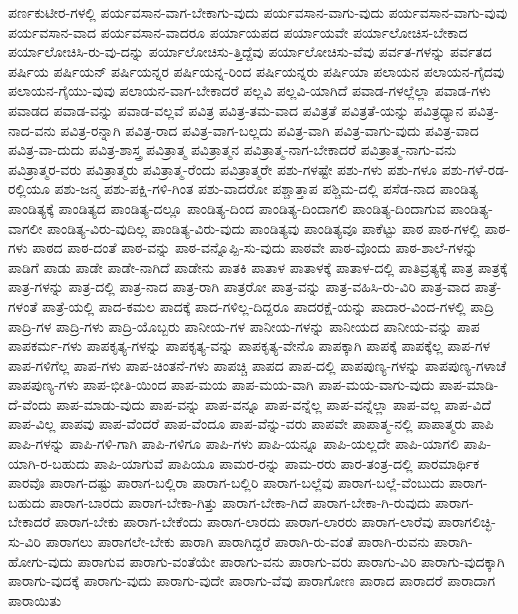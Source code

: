 {ಪರ್ಣಕುಟೀರ-ಗಳಲ್ಲಿ
ಪರ್ಯವಸಾನ-ವಾಗ-ಬೇಕಾಗು-ವುದು
ಪರ್ಯವಸಾನ-ವಾಗು-ವುದು
ಪರ್ಯವಸಾನ-ವಾಗು-ವುವು
ಪರ್ಯವಸಾನ-ವಾದ
ಪರ್ಯವಸಾನ-ವಾದರೂ
ಪರ್ಯಾಯಪದ
ಪರ್ಯಾಯವೇ
ಪರ್ಯಾಲೋಚಿಸ-ಬೇಕಾದ
ಪರ್ಯಾಲೋಚಿಸಿ-ರು-ವು-ದನ್ನು
ಪರ್ಯಾಲೋಚಿಸು-ತ್ತಿದ್ದೆವು
ಪರ್ಯಾಲೋಚಿಸು-ವೆವು
ಪರ್ವತ-ಗಳನ್ನು
ಪರ್ವತದ
ಪರ್ಷಿಯ
ಪರ್ಷಿಯನ್
ಪರ್ಷಿಯನ್ನರ
ಪರ್ಷಿಯನ್ನ-ರಿಂದ
ಪರ್ಷಿಯನ್ನರು
ಪರ್ಷಿಯಾ
ಪಲಾಯನ
ಪಲಾಯನ-ಗೈದವು
ಪಲಾಯನ-ಗೈಯು-ವುವು
ಪಲಾಯನ-ವಾಗ-ಬೇಕಾದರೆ
ಪಲ್ಲವಿ
ಪಲ್ಲವಿ-ಯಾಗಿದೆ
ಪವಾಡ-ಗಳಲ್ಲೆಲ್ಲಾ
ಪವಾಡ-ಗಳು
ಪವಾಡದ
ಪವಾಡ-ವನ್ನು
ಪವಾಡ-ವಲ್ಲವೆ
ಪವಿತ್ರ
ಪವಿತ್ರ-ತಮ-ವಾದ
ಪವಿತ್ರತೆ
ಪವಿತ್ರತೆ-ಯನ್ನು
ಪವಿತ್ರಧ್ಯಾನ
ಪವಿತ್ರ-ನಾದ-ವನು
ಪವಿತ್ರ-ರನ್ನಾಗಿ
ಪವಿತ್ರ-ರಾದ
ಪವಿತ್ರ-ವಾಗ-ಬಲ್ಲದು
ಪವಿತ್ರ-ವಾಗಿ
ಪವಿತ್ರ-ವಾಗು-ವುದು
ಪವಿತ್ರ-ವಾದ
ಪವಿತ್ರ-ವಾ-ದುದು
ಪವಿತ್ರ-ಶಾಸ್ತ್ರ
ಪವಿತ್ರಾತ್ಮ
ಪವಿತ್ರಾತ್ಮನ
ಪವಿತ್ರಾತ್ಮ-ನಾಗ-ಬೇಕಾದರೆ
ಪವಿತ್ರಾತ್ಮ-ನಾಗು-ವನು
ಪವಿತ್ರಾತ್ಮರ-ವರು
ಪವಿತ್ರಾತ್ಮರು
ಪವಿತ್ರಾತ್ಮ-ರೆಂದು
ಪವಿತ್ರಾತ್ಮರೇ
ಪಶು-ಗಳಷ್ಟೇ
ಪಶು-ಗಳು
ಪಶು-ಗಳೂ
ಪಶು-ಗಳೆ-ರಡ-ರಲ್ಲಿಯೂ
ಪಶು-ಜನ್ಮ
ಪಶು-ಪಕ್ಷಿ-ಗಳಿ-ಗಿಂತ
ಪಶು-ವಾದರೋ
ಪಶ್ಚಾತ್ತಾಪ
ಪಶ್ಚಿಮ-ದಲ್ಲಿ
ಪಸೆಡ-ನಾದ
ಪಾಂಡಿತ್ಯ
ಪಾಂಡಿತ್ಯಕ್ಕೆ
ಪಾಂಡಿತ್ಯದ
ಪಾಂಡಿತ್ಯ-ದಲ್ಲೂ
ಪಾಂಡಿತ್ಯ-ದಿಂದ
ಪಾಂಡಿತ್ಯ-ದಿಂದಾಗಲಿ
ಪಾಂಡಿತ್ಯ-ದಿಂದಾಗುವ
ಪಾಂಡಿತ್ಯ-ವಾಗಲೀ
ಪಾಂಡಿತ್ಯ-ವಿರು-ವುದಿಲ್ಲ
ಪಾಂಡಿತ್ಯ-ವಿರು-ವುದು
ಪಾಂಡಿತ್ಯವು
ಪಾಂಡಿತ್ಯವೂ
ಪಾಕೆಟ್ಟು
ಪಾಠ
ಪಾಠ-ಗಳಲ್ಲಿ
ಪಾಠ-ಗಳು
ಪಾಠದ
ಪಾಠ-ದಂತೆ
ಪಾಠ-ವನ್ನು
ಪಾಠ-ವನ್ನೊಪ್ಪಿ-ಸು-ವುದು
ಪಾಠವೇ
ಪಾಠ-ವೊಂದು
ಪಾಠ-ಶಾಲೆ-ಗಳನ್ನು
ಪಾಡಿಗೆ
ಪಾಡು
ಪಾಡೇ
ಪಾಡೇ-ನಾಗಿದೆ
ಪಾಡೇನು
ಪಾತಕಿ
ಪಾತಾಳ
ಪಾತಾಳಕ್ಕೆ
ಪಾತಾಳ-ದಲ್ಲಿ
ಪಾತಿವ್ರತ್ಯಕ್ಕೆ
ಪಾತ್ರ
ಪಾತ್ರಕ್ಕೆ
ಪಾತ್ರ-ಗಳನ್ನು
ಪಾತ್ರ-ದಲ್ಲಿ
ಪಾತ್ರ-ನಾದ
ಪಾತ್ರ-ರಾಗಿ
ಪಾತ್ರರೋ
ಪಾತ್ರ-ವನ್ನು
ಪಾತ್ರ-ವಹಿಸಿ-ರು-ವಿರಿ
ಪಾತ್ರ-ವಾದ
ಪಾತ್ರೆ-ಗಳಂತೆ
ಪಾತ್ರೆ-ಯಲ್ಲಿ
ಪಾದ-ಕಮಲ
ಪಾದಕ್ಕೆ
ಪಾದ-ಗಳಿಲ್ಲ-ದಿದ್ದರೂ
ಪಾದರಕ್ಷೆ-ಯನ್ನು
ಪಾದಾರ-ವಿಂದ-ಗಳಲ್ಲಿ
ಪಾದ್ರಿ
ಪಾದ್ರಿ-ಗಳ
ಪಾದ್ರಿ-ಗಳು
ಪಾದ್ರಿ-ಯೊಬ್ಬರು
ಪಾನೀಯ-ಗಳ
ಪಾನೀಯ-ಗಳನ್ನು
ಪಾನೀಯದ
ಪಾನೀಯ-ವನ್ನು
ಪಾಪ
ಪಾಪಕರ್ಮ-ಗಳು
ಪಾಪಕೃತ್ಯ-ಗಳನ್ನು
ಪಾಪಕೃತ್ಯ-ವನ್ನು
ಪಾಪಕೃತ್ಯ-ವೇನೊ
ಪಾಪಕ್ಕಾಗಿ
ಪಾಪಕ್ಕೆ
ಪಾಪಕ್ಕೆಲ್ಲ
ಪಾಪ-ಗಳ
ಪಾಪ-ಗಳಿಗೆಲ್ಲ
ಪಾಪ-ಗಳು
ಪಾಪ-ಚಿಂತನೆ-ಗಳು
ಪಾಪಚ್ಚಿ
ಪಾಪದ
ಪಾಪ-ದಲ್ಲಿ
ಪಾಪಪುಣ್ಯ-ಗಳನ್ನು
ಪಾಪಪುಣ್ಯ-ಗಳಾಚೆ
ಪಾಪಪುಣ್ಯ-ಗಳು
ಪಾಪ-ಭೀತಿ-ಯಿಂದ
ಪಾಪ-ಮಯ
ಪಾಪ-ಮಯ-ವಾಗಿ
ಪಾಪ-ಮಯ-ವಾಗು-ವುದು
ಪಾಪ-ಮಾಡಿ-ದೆ-ವೆಂದು
ಪಾಪ-ಮಾಡು-ವುದು
ಪಾಪ-ವನ್ನು
ಪಾಪ-ವನ್ನೂ
ಪಾಪ-ವನ್ನೆಲ್ಲ
ಪಾಪ-ವನ್ನೆಲ್ಲಾ
ಪಾಪ-ವಲ್ಲ
ಪಾಪ-ವಿದೆ
ಪಾಪ-ವಿಲ್ಲ
ಪಾಪವು
ಪಾಪ-ವೆಂದರೆ
ಪಾಪ-ವೆಂದೂ
ಪಾಪ-ವೆನ್ನು-ವರು
ಪಾಪವೇ
ಪಾಪಾತ್ಮ-ನಲ್ಲಿ
ಪಾಪಾತ್ಮರು
ಪಾಪಿ
ಪಾಪಿ-ಗಳನ್ನು
ಪಾಪಿ-ಗಳಿ-ಗಾಗಿ
ಪಾಪಿ-ಗಳಿಗೂ
ಪಾಪಿ-ಗಳು
ಪಾಪಿ-ಯನ್ನೂ
ಪಾಪಿ-ಯಲ್ಲದೇ
ಪಾಪಿ-ಯಾಗಲಿ
ಪಾಪಿ-ಯಾಗಿ-ರ-ಬಹುದು
ಪಾಪಿ-ಯಾಗುವೆ
ಪಾಪಿಯೂ
ಪಾಮರ-ರನ್ನು
ಪಾಮ-ರರು
ಪಾರ-ತಂತ್ರ-ದಲ್ಲಿ
ಪಾರಮಾರ್ಥಿಕ
ಪಾರವೊ
ಪಾರಾಗ-ದಷ್ಟು
ಪಾರಾಗ-ಬಲ್ಲಿರಾ
ಪಾರಾಗ-ಬಲ್ಲಿರಿ
ಪಾರಾಗ-ಬಲ್ಲೆವು
ಪಾರಾಗ-ಬಲ್ಲೆ-ವೆಂಬುದು
ಪಾರಾಗ-ಬಹುದು
ಪಾರಾಗ-ಬಾರದು
ಪಾರಾಗ-ಬೇಕಾ-ಗಿತ್ತು
ಪಾರಾಗ-ಬೇಕಾ-ಗಿದೆ
ಪಾರಾಗ-ಬೇಕಾ-ಗಿ-ರುವುದು
ಪಾರಾಗ-ಬೇಕಾದರೆ
ಪಾರಾಗ-ಬೇಕು
ಪಾರಾಗ-ಬೇಕೆಂದು
ಪಾರಾಗ-ಲಾರದು
ಪಾರಾಗ-ಲಾರರು
ಪಾರಾಗ-ಲಾರೆವು
ಪಾರಾಗಲಿಚ್ಛಿ-ಸು-ವಿರಿ
ಪಾರಾಗಲು
ಪಾರಾಗಲೇ-ಬೇಕು
ಪಾರಾಗಿ
ಪಾರಾಗಿದ್ದರೆ
ಪಾರಾಗಿ-ರು-ವಂತೆ
ಪಾರಾಗಿ-ರುವನು
ಪಾರಾಗಿ-ಹೋಗು-ವುದು
ಪಾರಾಗುವ
ಪಾರಾಗು-ವಂತೆಯೇ
ಪಾರಾಗು-ವನು
ಪಾರಾಗು-ವರು
ಪಾರಾಗು-ವಿರಿ
ಪಾರಾಗು-ವುದಕ್ಕಾಗಿ
ಪಾರಾಗು-ವುದಕ್ಕೆ
ಪಾರಾಗು-ವುದು
ಪಾರಾಗು-ವುದೇ
ಪಾರಾಗು-ವೆವು
ಪಾರಾಗೋಣ
ಪಾರಾದ
ಪಾರಾದರೆ
ಪಾರಾದಾಗ
ಪಾರಾಯಿತು
}
